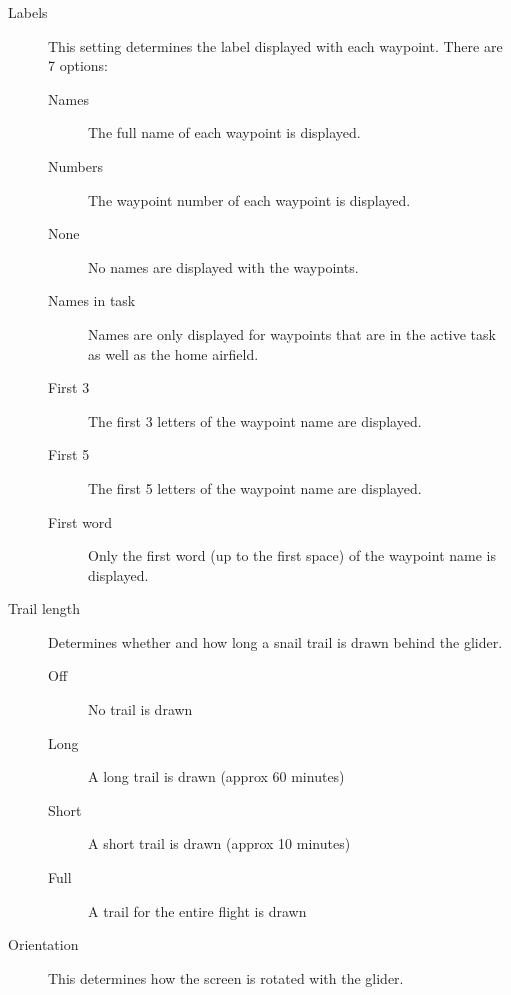 \documentclass[a4paper,12pt]{refrep}
\begin{document}
\begin{description}
\item[Labels] This setting determines the label displayed with each waypoint. There are 7 options:


\begin{description}
\item[Names] The full name of each waypoint is displayed.
\item[Numbers] The waypoint number of each waypoint is displayed.
\item[None] No names are displayed with the waypoints.
\item[Names in task] Names are only displayed for waypoints that are in the active task as well as the home airfield.
\item[First 3] The first 3 letters of the waypoint name are displayed.
\item[First 5] The first 5 letters of the waypoint name are displayed.
\item[First word] Only the first word (up to the first space) of the waypoint name is displayed.
\end{description}
\item[Trail length] Determines whether and how long a snail trail is drawn behind the glider.
\begin{description}
\item[Off] No trail is drawn
\item[Long] A long trail is drawn (approx 60 minutes)
\item[Short] A short trail is drawn (approx 10 minutes) 
\item[Full] A trail for the entire flight is drawn
\end{description}
\item[Orientation]  This determines how the screen is rotated with the glider.


\end{description}
\end{document}
